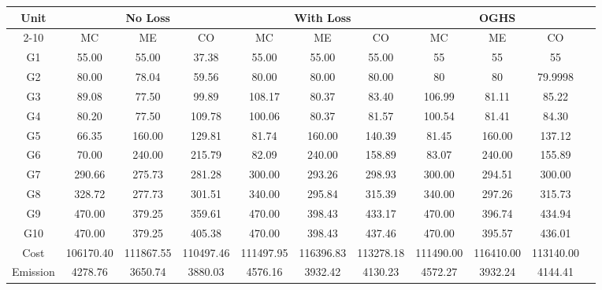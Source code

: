 \begin{table*}[!htbp]
\centering
\renewcommand{\arraystretch}{1.3}
\caption{Generation schedule (MW) and comparison for TS-2}
\label{table_ts2}
\begin{threeparttable}[c]
\scalebox{0.7} {
\begin{tabular}{|c|c|c|c|c|c|c|c|c|c|c|}
\hline
\multirow{2}{*}{Unit} & \multicolumn{3}{c|}{No Loss} & \multicolumn{3}{c|}{With Loss} & \multicolumn{3}{c|}{OGHS  \cite{16EPESedGreedy}} \\\cline{2-10}
 & MC & ME & CO & MC & ME & CO & MC & ME & CO\\
\hline
G1	&	55.00	&	55.00	&	37.38	&	55.00	&	55.00	&	55.00 &	55	&	55	&	55\\
\hline
G2	&	80.00	&	78.04	&	59.56	&	80.00	&	80.00	&	80.00 &	80	&	80	&	79.9998\\
\hline
G3	&	89.08	&	77.50	&	99.89	&	108.17	&	80.37	&	83.40 &	106.99	&	81.11	&	85.22\\
\hline
G4	&	80.20	&	77.50	&	109.78	&	100.06	&	80.37	&	81.57 &	100.54	&	81.41	&	84.30\\
\hline
G5	&	66.35	&	160.00	&	129.81	&	81.74	&	160.00	&	140.39 &	81.45	&	160.00	&	137.12\\
\hline
G6	&	70.00	&	240.00	&	215.79	&	82.09	&	240.00	&	158.89 &	83.07	&	240.00	&	155.89\\
\hline
G7	&	290.66	&	275.73	&	281.28	&	300.00	&	293.26	&	298.93 &	300.00	&	294.51	&	300.00\\
\hline
G8	&	328.72	&	277.73	&	301.51	&	340.00	&	295.84	&	315.39 &	340.00	&	297.26	&	315.73\\
\hline
G9	&	470.00	&	379.25	&	359.61	&	470.00	&	398.43	&	433.17 &	470.00	&	396.74	&	434.94\\
\hline
G10	&	470.00	&	379.25	&	405.38	&	470.00	&	398.43	&	437.46 &	470.00	&	395.57	&	436.01\\
\hline
Cost	&	106170.40	&	111867.55	&	110497.46	&	111497.95	&	116396.83	&	113278.18 &	111490.00	&	116410.00	&	113140.00\\
\hline
Emission &	4278.76	&	3650.74	&	3880.03	&	4576.16	&	3932.42	&	4130.23 &	4572.27	&	3932.24	&	4144.41\\
\hline
\end{tabular}
}
\end{threeparttable}
\end{table*}

